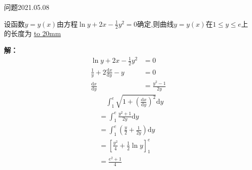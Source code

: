 \begin{mybox}{问题2021.05.08}
	
	\qquad 设函数$y=y(x)$由方程$\ln y+2x -\frac{1}{2}y^2=0$确定,则曲线$y=y(x)$在$1\le y\le e$上的长度为 \underline{\hbox to 20mm{}}
\end{mybox}
\noindent
\textbf{解：}
\begin{align*}
	\ln y+2x -\frac{1}{2}y^2&=0\\
	\frac{1}{y}+2\frac{\mathrm{d}x}{\mathrm{d}y}-y&=0\\
	\frac{\mathrm{d}x}{\mathrm{d}y}&=\frac{y^2-1}{2y}
\end{align*}
\begin{align*}
	&\quad\int_{1}^{e} \sqrt{1+(\frac{\mathrm{d}x}{\mathrm{d}y})^2}\mathrm{d}y\\
	&=\int_{1}^{e} \frac{y^2+1}{2y}\mathrm{d}y\\
	&=\int_{1}^{e} (\frac{y}{2}+\frac{1}{2y})\mathrm{d}y\\
	&=[\frac{y^2}{4}+\frac{1}{2} \ln y]_{1}^{e}\\
	&=\frac{e^2+1}{4}
\end{align*}